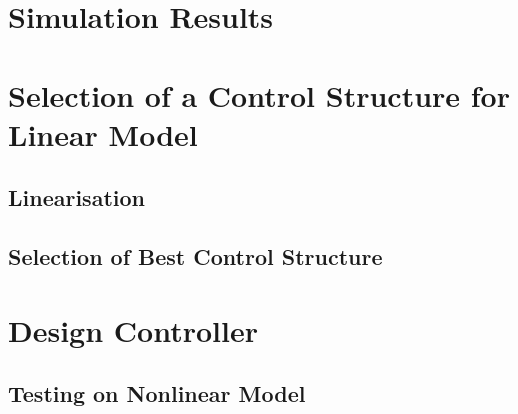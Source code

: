 \documentclass[paper=letter, fontsize=12pt]{article}
\begin{document}
\section{Simulation Results}





\section{Selection of a Control Structure for Linear Model}
\subsection{Linearisation}
\subsection{Selection of Best Control Structure}






\section{Design Controller}
\subsection{Testing on Nonlinear Model}










\end{document}
